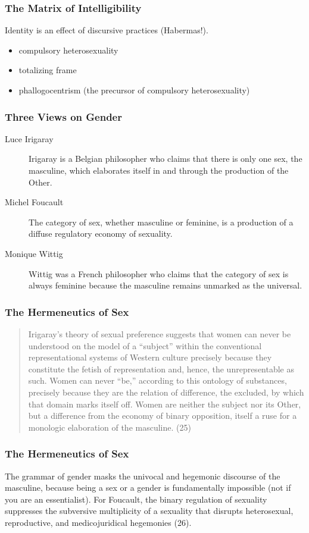 \documentclass[xcolor=dvipsnames]{beamer}
\begin{document}
\begin{frame}
  \frametitle{The Matrix of Intelligibility}
  Identity is an effect of discursive practices (Habermas!). 
  \begin{itemize}
  \item compulsory heterosexuality
  \item totalizing frame
  \item phallogocentrism (the precursor of compulsory heterosexuality)
  \end{itemize}
\end{frame}

\begin{frame}
  \frametitle{Three Views on Gender}
  \begin{description}
  \item[Luce Irigaray] Irigaray is a Belgian philosopher who claims
    that there is only one sex, the masculine, which elaborates itself
    in and through the production of the Other.
  \item[Michel Foucault] The category of sex, whether masculine or
    feminine, is a production of a diffuse regulatory economy of
    sexuality.
  \item[Monique Wittig] Wittig was a French philosopher who claims
    that the category of sex is always feminine because the masculine
    remains unmarked as the universal.
  \end{description}
\end{frame}

\begin{frame}
  \frametitle{The Hermeneutics of Sex}
  \begin{quote}
    Irigaray's theory of sexual preference suggests that women can
    never be understood on the model of a ``subject'' within the
    conventional representational systems of  Western culture
    precisely because they constitute the fetish of representation
    and, hence, the unrepresentable as such. Women can never ``be,''
    according to this ontology of substances, precisely because they
    are the relation of difference, the excluded, by which that domain
    marks itself off. Women are neither the subject nor its Other, but
    a difference from the economy of binary opposition, itself a ruse
    for a monologic elaboration of the masculine. (25)
  \end{quote}
\end{frame}

\begin{frame}
  \frametitle{The Hermeneutics of Sex}
  The grammar of gender masks the univocal and hegemonic discourse of
  the masculine, because being a sex or a gender is fundamentally
  impossible (not if you are an essentialist). For Foucault, the
  binary regulation of sexuality suppresses the subversive
  multiplicity of a sexuality that disrupts heterosexual,
  reproductive, and medicojuridical hegemonies (26).
\end{frame}
\end{document}
